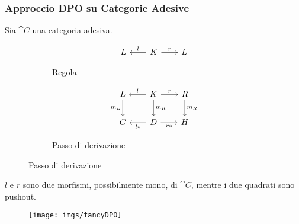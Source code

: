 \documentclass[8pt]{beamer}
\begin{document}
\begin{frame}[fragile]\frametitle{Approccio DPO su Categorie Adesive}
	Sia $\cat C$ una categoria adesiva.
	\begin{figure}[h]
		\begin{subfigure}{0.25\textwidth}
			\[\begin{tikzcd}[row sep = 20, column sep = 20] L & K \arrow[r, "r"] \arrow[l, "l"swap] & L \end{tikzcd}\]
		\label{fig:rule}
		\caption{Regola}
		\end{subfigure}
		\qquad
		\begin{subfigure}{0.25\textwidth}
			\[\begin{tikzcd}[row sep = 20, column sep = 20]
			L \arrow[d, "{m_L}"swap] & K\arrow[d, "{m_K}"] \arrow[r, "r"] \arrow[l, "l"swap] & R \arrow[d, "{m_R}"] \\
				G & D \arrow[l, "{l*}"] \arrow[r, "{r*}"swap] & H
		\end{tikzcd}\]
		\caption{Passo di derivazione}
		\label{fig:step}
		\end{subfigure}
	\end{figure}
	$l$ e $r$ sono due morfismi, possibilmente mono, di $\cat C$, 
	mentre i due quadrati sono pushout.


	\begin{figure}
		\texttt{[image: imgs/fancyDPO]}
	\end{figure}
\end{frame}
\end{document}
